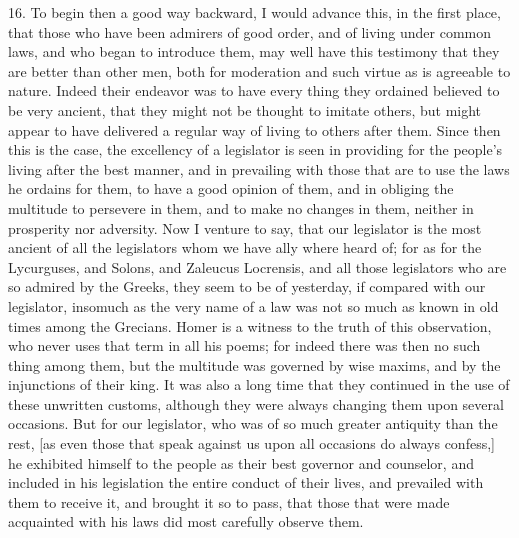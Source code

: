 16. To begin then a good way backward, I would advance this, in the first
place, that those who have been admirers of good order, and of living
under common laws, and who began to introduce them, may well have this
testimony that they are better than other men, both for moderation and
such virtue as is agreeable to nature. Indeed their endeavor was to have
every thing they ordained believed to be very ancient, that they might not
be thought to imitate others, but might appear to have delivered a regular
way of living to others after them. Since then this is the case, the
excellency of a legislator is seen in providing for the people's living
after the best manner, and in prevailing with those that are to use the
laws he ordains for them, to have a good opinion of them, and in obliging
the multitude to persevere in them, and to make no changes in them,
neither in prosperity nor adversity. Now I venture to say, that our
legislator is the most ancient of all the legislators whom we have ally
where heard of; for as for the Lycurguses, and Solons, and Zaleucus
Locrensis, and all those legislators who are so admired by the Greeks,
they seem to be of yesterday, if compared with our legislator, insomuch as
the very name of a law was not so much as known in old times among the
Grecians. Homer is a witness to the truth of this observation, who never
uses that term in all his poems; for indeed there was then no such thing
among them, but the multitude was governed by wise maxims, and by the
injunctions of their king. It was also a long time that they continued in
the use of these unwritten customs, although they were always changing
them upon several occasions. But for our legislator, who was of so much
greater antiquity than the rest, [as even those that speak against us upon
all occasions do always confess,] he exhibited himself to the people as
their best governor and counselor, and included in his legislation the
entire conduct of their lives, and prevailed with them to receive it, and
brought it so to pass, that those that were made acquainted with his laws
did most carefully observe them.

